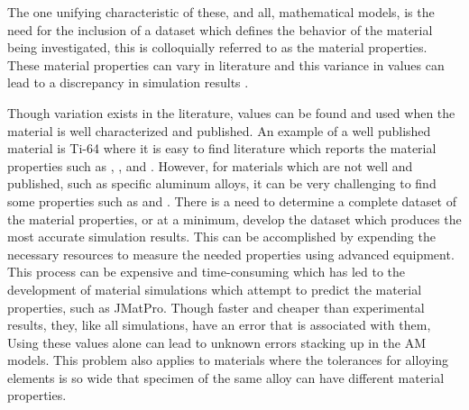 The one unifying characteristic of these, and all, mathematical models, is the need for the inclusion of a dataset which defines the behavior of the material being investigated, this is colloquially referred to as the material properties.  These material properties can vary in literature and this variance in values can lead to a discrepancy in simulation results \cite{daryabeigiThermalPropertiesAccurate2011}.

Though variation exists in the literature, values can be found and used when the material is well characterized and published.  An example of a well published material is Ti-64 where it is easy to find literature which reports the material properties such as  \cite{welschgerhard_1993},  \cite{boivineau_2006}, and  \cite{fan_2012}.  However, for materials which are not well  and published, such as specific aluminum alloys, it can be very challenging  to find some properties such as  \cite{lundberg_material_1994} and  \cite{leitner_thermophysical_2017}.  There is a need to determine a complete dataset of the material properties, or at a minimum, develop the dataset which produces the most accurate simulation results. 
This can be accomplished by expending the necessary resources to measure the needed properties using advanced equipment.
This process can be expensive and time-consuming which has led to the development of material simulations which attempt to predict the material properties, such as JMatPro\cite{jmatpro}.  Though faster and cheaper than experimental results, they, like all simulations, have an error that is associated with them,   Using these values alone can lead to unknown errors stacking up in the \ac{AM} models.
This problem also applies to materials where the tolerances for alloying elements is so wide that specimen of the same alloy can have different material properties.  

